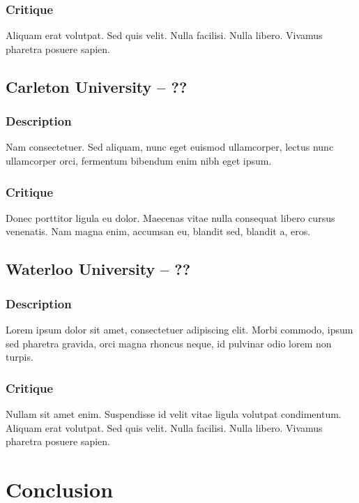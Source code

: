 \documentclass[10pt]{article}
\begin{document}
\begin{multicols}{2}
\subsubsection*{Critique}
Aliquam erat volutpat. Sed quis velit. Nulla facilisi. Nulla libero. Vivamus pharetra posuere sapien. 

\subsection*{Carleton University -- ??}
\subsubsection*{Description}
Nam consectetuer. Sed aliquam, nunc eget euismod ullamcorper, lectus nunc ullamcorper orci, fermentum bibendum enim nibh eget ipsum. 

\subsubsection*{Critique}
Donec porttitor ligula eu dolor. Maecenas vitae nulla consequat libero cursus venenatis. Nam magna enim, accumsan eu, blandit sed, blandit a, eros.

\subsection*{Waterloo University -- ??}
\subsubsection*{Description}
Lorem ipsum dolor sit amet, consectetuer adipiscing elit. Morbi commodo, ipsum sed pharetra gravida, orci magna rhoncus neque, id pulvinar odio lorem non turpis. 

\subsubsection*{Critique}
Nullam sit amet enim. Suspendisse id velit vitae ligula volutpat condimentum. Aliquam erat volutpat. Sed quis velit. Nulla facilisi. Nulla libero. Vivamus pharetra posuere sapien. 

\section*{Conclusion}

\end{multicols}
\end{document}
